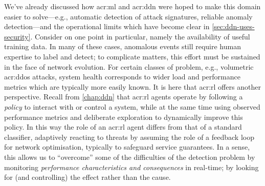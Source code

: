 
We've already discussed how \gls{acr:ml} and \gls{acr:ddn} were hoped to make this domain easier to solve---e.g., automatic detection of attack signatures, reliable anomaly detection---and the operational limits which have become clear in \cref{sec:ddn-uses-security}.
Consider on one point in particular, namely the availability of useful training data.
In many of these cases, anomalous events still require human expertise to label and detect; to complicate matters, this effort must be sustained in the face of network evolution.
For certain classes of problem, e.g., volumetric \gls{acr:ddos} attacks, system health corresponds to wider load and performance metrics which are typically more easily known.
It is here that \gls{acr:rl} offers another perspective.
Recall from \cref{chap:ddn} that \gls{acr:rl} agents operate by following a \emph{policy} to interact with or control a system, while at the same time using observed performance metrics and deliberate exploration to dynamically improve this policy.
In this way the role of an \gls{acr:rl} agent differs from that of a standard classifier, adaptively reacting to threats by assuming the role of a feedback loop for network optimisation, typically to safeguard service guarantees.
In a sense, this allows us to ``overcome'' some of the difficulties of the detection problem by monitoring \emph{performance characteristics and consequences} in real-time; by looking for (and controlling) the effect rather than the cause.


